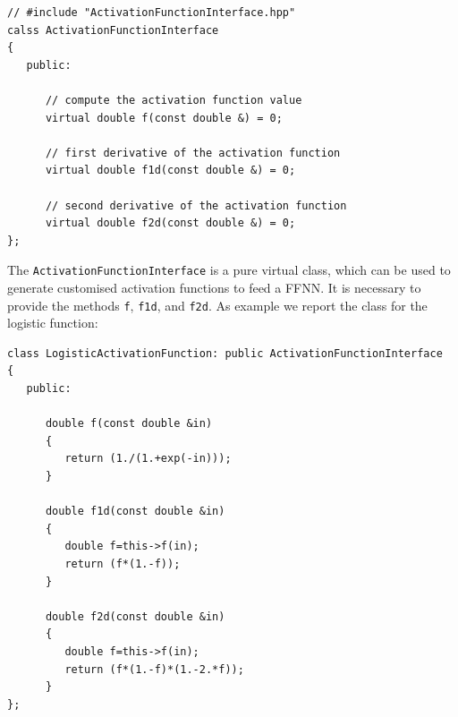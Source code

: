 \documentclass[11pt,a4paper,twoside]{article}
\begin{document}
\begin{verbatim}
// #include "ActivationFunctionInterface.hpp"
calss ActivationFunctionInterface
{
   public:
   
      // compute the activation function value
      virtual double f(const double &) = 0;
   
      // first derivative of the activation function
      virtual double f1d(const double &) = 0;
   
      // second derivative of the activation function
      virtual double f2d(const double &) = 0;
};
\end{verbatim}

The \verb+ActivationFunctionInterface+ is a pure virtual class, which can be used to generate customised activation functions to feed a FFNN.
It is necessary to provide the methods \verb+f+, \verb+f1d+, and \verb+f2d+.
As example we report the class for the logistic function:

\begin{verbatim}
class LogisticActivationFunction: public ActivationFunctionInterface
{
   public:
   
      double f(const double &in)
      {
         return (1./(1.+exp(-in)));
      }
   
      double f1d(const double &in)
      {
         double f=this->f(in);
         return (f*(1.-f));
      }
   
      double f2d(const double &in)
      {
         double f=this->f(in);
         return (f*(1.-f)*(1.-2.*f));
      }
};

\end{verbatim}






\printindex
\end{document}
